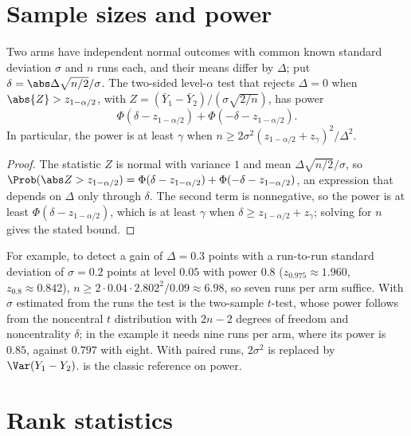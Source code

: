 \begin{refsection}
\section{Sample sizes and power}\label{sec:toolkit:power}

\begin{proposition}\label{thm:toolkit:power}
Two arms have independent normal outcomes with common known standard deviation $\sigma$ and $n$ runs each, and their means differ by $\Delta$; put $\delta=\abs\Delta\sqrt{n/2}/\sigma$. The two-sided level-$\alpha$ test that rejects $\Delta=0$ when $\abs{Z}>z_{1-\alpha/2}$, with $Z=(\bar Y_1-\bar Y_2)/(\sigma\sqrt{2/n})$, has power
\[
\Phi(\delta-z_{1-\alpha/2})+\Phi(-\delta-z_{1-\alpha/2}).
\]
In particular, the power is at least $\gamma$ when $n\ge2\sigma^2(z_{1-\alpha/2}+z_\gamma)^2/\Delta^2$.
\end{proposition}

\begin{proof}
The statistic $Z$ is normal with variance $1$ and mean $\Delta\sqrt{n/2}/\sigma$, so
$\Prob(\abs Z>z_{1-\alpha/2})=\Phi(\delta-z_{1-\alpha/2})+\Phi(-\delta-z_{1-\alpha/2})$, an expression that depends on $\Delta$ only through $\delta$. The second term is nonnegative, so the power is at least $\Phi(\delta-z_{1-\alpha/2})$, which is at least $\gamma$ when $\delta\ge z_{1-\alpha/2}+z_\gamma$; solving for $n$ gives the stated bound.
\end{proof}

For example, to detect a gain of $\Delta=0.3$ points with a run-to-run standard deviation of $\sigma=0.2$ points at level $0.05$ with power $0.8$ ($z_{0.975}\approx1.960$, $z_{0.8}\approx0.842$), $n\ge2\cdot0.04\cdot2.802^2/0.09\approx6.98$, so seven runs per arm suffice. With $\sigma$ estimated from the runs the test is the two-sample $t$-test, whose power follows from the noncentral $t$ distribution with $2n-2$ degrees of freedom and noncentrality $\delta$; in the example it needs nine runs per arm, where its power is $0.85$, against $0.797$ with eight. With paired runs, $2\sigma^2$ is replaced by $\Var(Y_1-Y_2)$. \Textcite{Cohen1988} is the classic reference on power.

\section{Rank statistics}\label{sec:toolkit:ranks}


\end{refsection}
